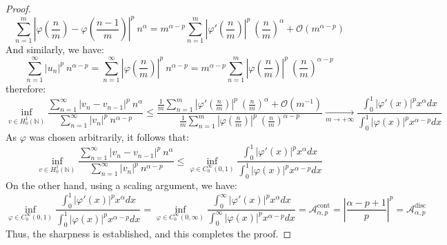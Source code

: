\documentclass[11pt]{amsart}
\newcommand{\1}{[1]}
\def\phi{\varphi}
\begin{document}
\begin{proof}
$$\sum_{n=1}^{m} \left|\phi\left(\frac{n}{m}\right)-\phi\left(\frac{n-1}{m}\right) \right|^{p} \ n^{\alpha} = m^{\alpha-p} \sum_{n=1}^{m} \left|\phi'\left(\frac{n}{m}\right) \right|^{p} \ \left(\frac{n}{m}\right)^{\alpha} + \mathcal{O} (m^{\alpha-p})
$$
And similarly, we have:
$$
\sum_{n=1}^{\infty} |u_{n}|^{p} \ n^{\alpha-p} =  \sum_{n=1}^{\infty} \left| \phi \left( \frac{n}{m} \right) \right|^p \ n^{\alpha-p}
= m^{\alpha-p} \sum_{n=1}^{m} \left| \phi \left( \frac{n}{m} \right) \right|^p \ \left(\frac{n}{m}\right)^{\alpha-p}
$$
therefore:
$$
\displaystyle \inf_{v \in H_{0}^{1}(\mathbb{N})} \frac{\displaystyle \sum_{n=1}^{\infty} |v_{n}-v_{n-1}|^{p} \ n^{\alpha} } {\displaystyle \sum_{n=1}^{\infty} |v_{n}|^{p} \ n^{\alpha-p} } \leq   \frac{\displaystyle  \frac{1}{m} \sum_{n=1}^{m} \left|\phi'\left(\frac{n}{m}\right) \right|^{p} \ \left(\frac{n}{m}\right)^{\alpha} + \mathcal{O} (m^{-1})}{\displaystyle \frac{1}{m} \sum_{n=1}^{m} \left| \phi \left( \frac{n}{m} \right) \right|^p \ \left(\frac{n}{m}\right)^{\alpha-p}} \underset{m \to +\infty}{\longrightarrow} \frac{\displaystyle \int_{0}^{1} |\phi'(x)|^p x^{\alpha} dx}{\displaystyle \int_{0}^{1} |\phi(x)|^p x^{\alpha-p} dx}
$$
As $\phi$ was chosen arbitrarily, it follows that:
$$\displaystyle \inf_{v \in H_{0}^{1}(\mathbb{N})} \frac{\displaystyle \sum_{n=1}^{\infty} |v_{n}-v_{n-1}|^{p} \ n^{\alpha} } {\displaystyle \sum_{n=1}^{\infty} |v_{n}|^{p} \ n^{\alpha-p} } \leq  \inf_{\phi \in C^{\infty}_{0} (0,1)} \frac{\displaystyle \int_{0}^{1} |\phi'(x)|^p x^{\alpha} dx}{\displaystyle \int_{0}^{1} |\phi(x)|^p x^{\alpha-p} dx}
$$
On the other hand, using a scaling argument, we have:
$$
 \inf_{\phi \in C^{\infty}_{0} (0,1)} \frac{\displaystyle \int_{0}^{1} |\phi'(x)|^p x^{\alpha} dx}{\displaystyle \int_{0}^{1} |\phi(x)|^p x^{\alpha-p} dx} = 
  \inf_{\phi \in C^{\infty}_{0} (0,\infty)} \frac{\displaystyle \int_{0}^{\infty} |\phi'(x)|^p x^{\alpha} dx}{\displaystyle \int_{0}^{\infty} |\phi(x)|^p  x^{\alpha-p} dx} = \mathcal{A}^{\text{cont}}_{\alpha,p} = \left|\frac{\alpha-p+1}{p} \right|^p = \mathcal{A}^{\text{disc}}_{\alpha,p}$$
Thus, the sharpness is established, and this completes the proof.
\end{proof}
\end{document}
